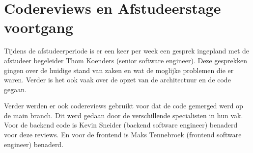 \section{Codereviews en Afstudeerstage voortgang}
\label{section:CodereviewsEnStageVoortgang}
Tijdens de afstudeerperiode is er een keer per week een gesprek ingepland met de afstudeer begeleider Thom Koenders (senior software engineer).
Deze gesprekken gingen over de huidige stand van zaken en wat de moglijke problemen die er waren.
Verder is het ook vaak over de opzet van de architectuur en de code gegaan.

\whitespace
Verder werden er ook codereviews gebruikt voor dat de code gemerged werd op de main branch.
Dit werd gedaan door de verschillende specialisten in hun vak.
Voor de backend code is Kevin Sneider (backend software engineer) benaderd voor deze reviews.
En voor de frontend is Maks Tennebroek (frontend software engineer) benaderd.
